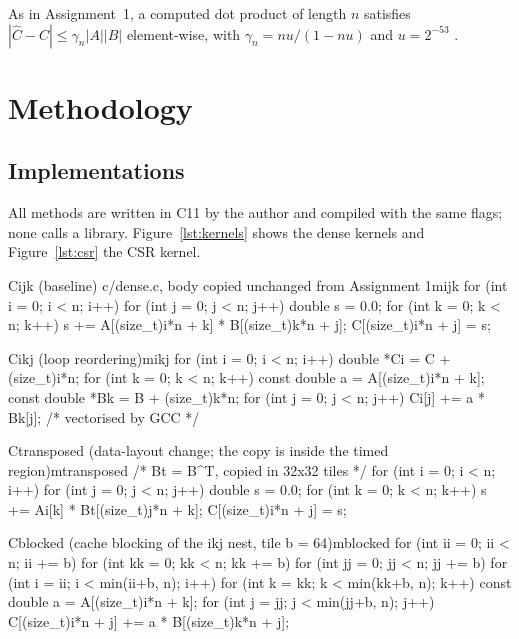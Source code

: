 \documentclass[11pt,a4paper]{article}
\newcommand{\concept}[1]{\par\addvspace{8pt}\Needspace{5\baselineskip}%
  \noindent{\color{accent}\bfseries\boldmath #1}\par\nopagebreak\vspace{2pt}}
\begin{document}
\concept{Error bound}
As in Assignment~1, a computed dot product of length $n$ satisfies $|\hat C-C|\le\gamma_n|A||B|$
element-wise, with $\gamma_n=nu/(1-nu)$ and $u=2^{-53}$ \cite[Sec.~3.5]{higham}.

\section{Methodology}

\subsection{Implementations}
All methods are written in C11 by the author and compiled with the same flags; none calls a
library. Figure~\ref{lst:kernels} shows the dense kernels and Figure~\ref{lst:csr} the CSR kernel.

\par\addvspace{4pt}
\label{lst:kernels}
\nopagebreak\vspace{2pt}
\begin{codebox}{C}{ijk (baseline) \textperiodcentered{} c/dense.c, body copied unchanged from Assignment 1}{mijk}
for (int i = 0; i < n; i++)
    for (int j = 0; j < n; j++) {
        double s = 0.0;
        for (int k = 0; k < n; k++) s += A[(size_t)i*n + k] * B[(size_t)k*n + j];
        C[(size_t)i*n + j] = s;
    }
\end{codebox}
\vspace{3pt}
\begin{codebox}{C}{ikj (loop reordering)}{mikj}
for (int i = 0; i < n; i++) {
    double *Ci = C + (size_t)i*n;
    for (int k = 0; k < n; k++) {
        const double a = A[(size_t)i*n + k];
        const double *Bk = B + (size_t)k*n;
        for (int j = 0; j < n; j++) Ci[j] += a * Bk[j];      /* vectorised by GCC */
    }
}
\end{codebox}
\vspace{3pt}
\begin{codebox}{C}{transposed (data-layout change; the copy is inside the timed region)}{mtransposed}
/* Bt = B^T, copied in 32x32 tiles */
for (int i = 0; i < n; i++)
    for (int j = 0; j < n; j++) {
        double s = 0.0;
        for (int k = 0; k < n; k++) s += Ai[k] * Bt[(size_t)j*n + k];
        C[(size_t)i*n + j] = s;
    }
\end{codebox}
\vspace{3pt}
\begin{codebox}{C}{blocked (cache blocking of the ikj nest, tile b = 64)}{mblocked}
for (int ii = 0; ii < n; ii += b)
  for (int kk = 0; kk < n; kk += b)
    for (int jj = 0; jj < n; jj += b)
      for (int i = ii; i < min(ii+b, n); i++)
        for (int k = kk; k < min(kk+b, n); k++) {
          const double a = A[(size_t)i*n + k];
          for (int j = jj; j < min(jj+b, n); j++)
            C[(size_t)i*n + j] += a * B[(size_t)k*n + j];  }
\end{codebox}
\par\addvspace{6pt}
\end{document}
